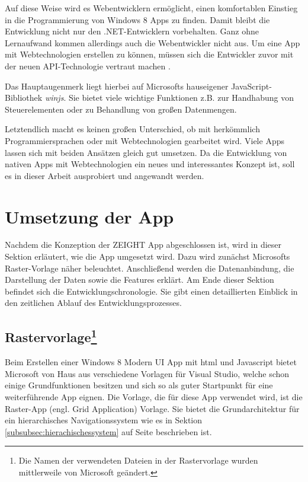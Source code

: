 \documentclass[12pt,a4paper,bibtotoc,abstracton]{scrartcl}
\begin{document}
Auf diese Weise wird es Webentwicklern ermöglicht, einen komfortablen Einstieg in die Programmierung von Windows 8 Apps zu finden. Damit bleibt die Entwicklung nicht nur den .NET-Entwicklern vorbehalten. Ganz ohne Lernaufwand kommen allerdings auch die Webentwickler nicht aus. Um eine App mit Webtechnologien erstellen zu können, müssen sich die Entwickler zuvor mit der neuen API-Technologie vertraut machen \citep{Bleske2012}.

Das Hauptaugenmerk liegt hierbei auf Microsofts hauseigener JavaScript-Bibliothek \textit{\ac{winjs}}. Sie bietet viele wichtige Funktionen z.B. zur Handhabung von Steuerelementen oder zu Behandlung von großen Datenmengen. 

Letztendlich macht es keinen großen Unterschied, ob mit herkömmlich Programmiersprachen oder mit Webtechnologien gearbeitet wird. Viele Apps lassen sich mit beiden Ansätzen gleich gut umsetzen. Da die Entwicklung von nativen Apps mit Webtechnologien ein neues und interessantes Konzept ist, soll es in dieser Arbeit ausprobiert und angewandt werden.

\newpage
\section{Umsetzung der App}
\label{sec:umsetzungderapp}
Nachdem die Konzeption der ZEIGHT App abgeschlossen ist, wird in dieser Sektion erläutert, wie die App umgesetzt wird. Dazu wird zunächst Microsofts Raster-Vorlage näher beleuchtet. Anschließend werden die Datenanbindung, die Darstellung der Daten sowie die Features erklärt. Am Ende dieser Sektion befindet sich die Entwicklungschronologie. Sie gibt einen detaillierten Einblick in den zeitlichen Ablauf des Entwicklungsprozesses.

\subsection[Rastervorlage] {Rastervorlage\footnote{Die Namen der verwendeten Dateien in der Rastervorlage wurden mittlerweile von Microsoft geändert.}}
\label{subsec:rastervorlage}
Beim Erstellen einer Windows 8 Modern UI App mit \ac{html} und Javascript bietet Microsoft von Haus aus verschiedene Vorlagen für Visual Studio, welche schon einige Grundfunktionen besitzen und sich so als guter Startpunkt für eine weiterführende App eignen. Die Vorlage, die für diese App verwendet wird, ist die Raster-App (engl. Grid Application) Vorlage. Sie bietet die Grundarchitektur für ein hierarchisches Navigationssystem wie es in Sektion \ref{subsubsec:hierachischessystem} auf Seite \pageref{subsubsec:hierachischessystem} beschrieben ist.
\end{document}

